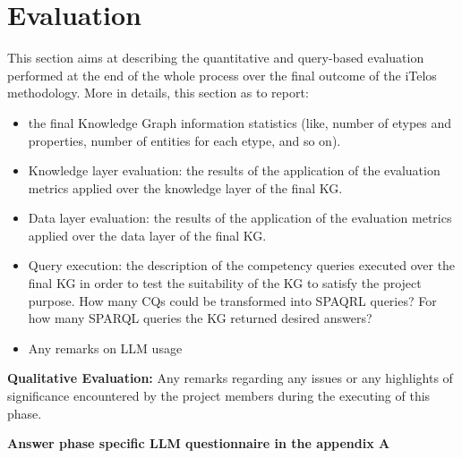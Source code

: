 \section{Evaluation}

This section aims at describing the quantitative and query-based evaluation performed at the end of the whole process over the final outcome of the iTelos methodology. More in details, this section as to report:

\begin{itemize}
    \item the final Knowledge Graph information statistics (like, number of etypes and properties, number of entities for each etype, and so on).
    \item Knowledge layer evaluation: the results of the application of the evaluation metrics applied over the knowledge layer of the final KG.
    \item Data layer evaluation: the results of the application of the evaluation metrics applied over the data layer of the final KG.
    \item Query execution: the description of the competency queries executed over the final KG in order to test the suitability of the KG to satisfy the project purpose. How many CQs could be transformed into SPAQRL queries? For how many SPARQL queries the KG returned desired answers?
    \item Any remarks on LLM usage
\end{itemize}

\noident \textbf{Qualitative Evaluation:} Any remarks regarding any issues or any highlights of significance encountered by the project members during the executing of this phase.

\noident \textbf{Answer phase specific LLM questionnaire in the appendix A}
